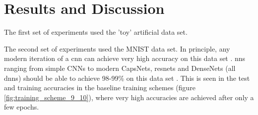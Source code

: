 \chapter{Results and Discussion}

The first set of experiments used the 'toy' artificial data set. 
\bigskip

The second set of experiments used the MNIST data set. In principle, any modern iteration of a \gls{cnn} can achieve very high accuracy on this data set \cite{mnist_sota_web}. \gls{nn}s ranging from simple CNNs to modern CapsNets, \gls{resnet}s and DenseNets (all \gls{dnn}s) should be able to achieve 98-99\% on this data set {\cite{mnist_sota_web}}. This is seen in the test and training accuracies in the baseline training schemes (figure \ref{fig:training_scheme_9_10}), where very high accuracies are achieved after only a few \gls{epoch}s. 
\bigskip




